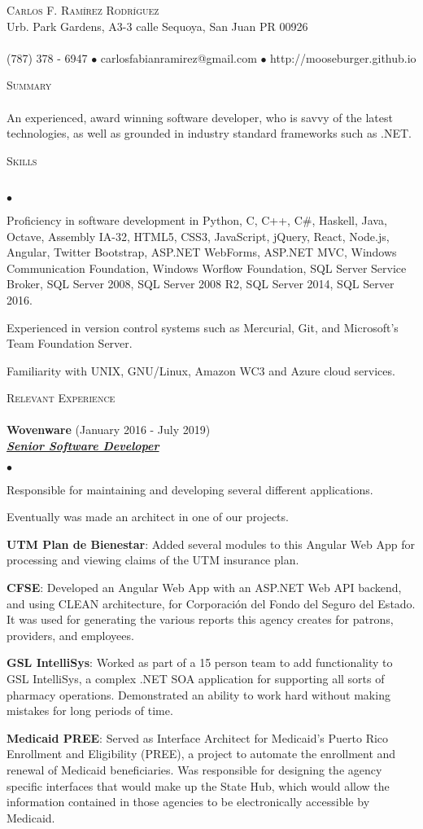 \documentclass{article}
\newcommand{\lineunder}{\vspace*{-8pt} \\ \hspace*{-18pt} \hrulefill \\}
\newcommand{\header}[1]{{\hspace*{-15pt}\vspace*{6pt} \textsc{#1}} \vspace*{-6pt} \lineunder}
\newcommand{\employer}[3]{{ \textbf{#1} (#2)\\ \underline{\textbf{\emph{#3}}}\\  }}
\newcommand{\contact}[3]{
\vspace*{-8pt}
\begin{center}
{\LARGE \scshape {#1}}\\
#2 \lineunder 
#3
\end{center}
\vspace*{-8pt}
}
\newenvironment{achievements}{\begin{list}{$\bullet$}{\topsep 0pt \itemsep -2pt}}{\vspace*{4pt}\end{list}}
\begin{document}
\small
\smallskip
\vspace*{-44pt}

\contact{Carlos F. Ram\'irez Rodr\'iguez}
{Urb. Park Gardens, A3-3 calle Sequoya, San Juan PR 00926}
{(787) 378 - 6947 $\bullet$ carlosfabianramirez@gmail.com $\bullet$ http://mooseburger.github.io}

\header{Summary}
An experienced, award winning software developer, who is savvy of the latest technologies, as well as grounded in industry standard frameworks such as .NET.  

\header{Skills}
\begin{achievements}
\item Proficiency in software development in Python, C, C++, C\string#, Haskell, Java, Octave, Assembly IA-32, HTML5, CSS3, JavaScript, jQuery, React, Node.js, Angular, Twitter Bootstrap, ASP.NET WebForms, ASP.NET MVC, Windows Communication Foundation, Windows Worflow Foundation, SQL Server Service Broker, SQL Server 2008, SQL Server 2008 R2, SQL Server 2014, SQL Server 2016.
\item Experienced in version control systems such as Mercurial, Git, and Microsoft's Team Foundation Server.
\item Familiarity with UNIX, GNU/Linux, Amazon WC3 and Azure cloud services.
\end{achievements}

\header{Relevant Experience}

\employer{Wovenware}{January 2016 - July 2019}{Senior Software Developer}
	\begin{achievements}
	\item Responsible for maintaining and developing several different applications.
	\item Eventually was made an architect in one of our projects.
	\item \textbf{UTM Plan de Bienestar}: Added several modules to this Angular Web App for processing and viewing claims of the UTM insurance plan.
	\item \textbf{CFSE}: Developed an Angular Web App with an ASP.NET Web API backend, and using CLEAN architecture, for Corporaci\'on del Fondo del Seguro del Estado. It was used for generating the various reports this agency creates for patrons, providers, and employees.
	\item \textbf{GSL IntelliSys}: Worked as part of a 15 person team to add functionality to GSL IntelliSys, a complex .NET SOA application for supporting all sorts of pharmacy operations. Demonstrated an ability to work hard without making mistakes for long periods of time.
	\item \textbf{Medicaid PREE}: Served as Interface Architect for Medicaid's Puerto Rico Enrollment and Eligibility (PREE), a project to automate the enrollment and renewal of Medicaid beneficiaries. Was responsible for designing the agency specific interfaces that would make up the State Hub, which would allow the information contained in those agencies to be electronically accessible by Medicaid. 
	\end{achievements}
\end{document}
